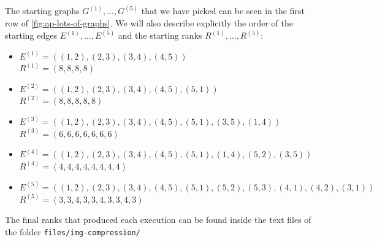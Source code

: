 \documentclass[11pt,a4paper,openright,oneside]{book}
\numberwithin{equation}{section}
\newcommand{\figref}[1]{\cref{#1}}
\begin{document}
{The starting graphs $G^{(1)},\dots , G^{(5)}$ that we have picked can be seen in the first row of \figref{fig:ap-lots-of-graphs}.
We will also describe explicitly the order of the starting edges $E^{(1)}, \dots, E^{(5)}$ and the starting ranks $R^{(1)}, \dots, R^{(5)}$: 

\begin{itemize}
    \item $E^{(1)} = ((1,2), (2, 3), (3, 4), (4, 5))$ \\ 
        $R^{(1)} = (8,8,8,8)$
    \item $E^{(2)} = ((1,2), (2, 3), (3, 4), (4, 5), (5, 1))$ \\
        $R^{(2)} = (8,8,8,8,8)$
    \item $E^{(3)} = ((1,2), (2, 3), (3, 4), (4, 5), (5, 1), (3, 5), (1, 4))$ \\
        $R^{(3)} = (6,6,6,6,6,6,6)$
    \item $E^{(4)} = ((1,2), (2, 3), (3, 4), (4, 5), (5, 1), (1, 4), (5, 2), (3, 5))$ \\
        $R^{(4)} = (4,4,4,4, 4,4,4,4)$
    \item $E^{(5)} = ((1,2), (2, 3), (3, 4), (4, 5), (5, 1), (5, 2), (5, 3), (4, 1), (4, 2), (3, 1))$ \\
        $R^{(5)} = (3,3,4,3,3,4,3,3,4,3)$
\end{itemize}

The final ranks that produced each execution can be found inside the text files of the folder \verb|files/img-compression/|

\begin{figure}[h]
\begin{adjustwidth}{-30pt}{-30pt}
    \centering


\end{adjustwidth}
\end{figure}}
\end{document}
